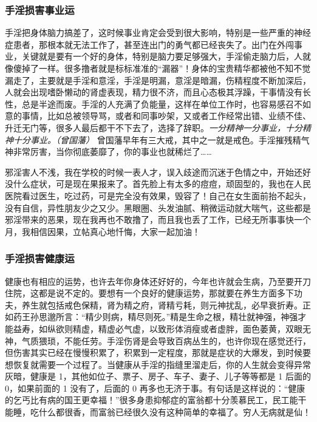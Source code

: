 \subsubsection{手淫损害事业运}

手淫把身体脑力搞差了，这时候事业肯定会受到很大影响，特别是一些严重的神经症患者，那根本就无法工作了，甚至连出门的勇气都已经丧失了。出门在外闯事业，关键就是要有一个好的身体，特别是脑力要足够强大，手淫偷走脑力后，人就像傻掉了一样。很多撸者就是标标准准的“漏器”！身体的宝贵精华都被他不知不觉漏走了，主要就是手淫和意淫，手淫是明漏，意淫是暗漏，伤精程度不断加深后，人就会出现嗜卧懒动的肾虚表现，精力很不济，而且心态极其浮躁，干事情没有长性，总是半途而废。手淫的人充满了负能量，这样在单位工作时，也容易感召不如意的事情，比如总被领导骂，或者和同事吵架，又或者工作经常出错、业绩不佳、升迁无门等，很多人最后都干不下去了，选择了辞职。\textit{一分精神一分事业，十分精神十分事业。（曾国藩）} 曾国藩早年有三大戒，其中之一就是戒色。手淫摧残精气神非常厉害，当你彻底萎靡了，你的事业也就稀烂了……

\begin{case}[手淫损害事业运]
    邪淫害人不浅，我在学校的时候一表人才，误入歧途而沉迷于色情之中，开始还好没什么症状，可是现在果报来了。首先脸上有太多的痘痘，顽固型的，我也在人民医院看过医生，吃过药，可是完全没有效果，毁容了！自己在女生面前抬不起头，没有自信，异性朋友少之又少。黑眼圈、头发油腻、稍微运动就大喘气，这些都是邪淫带来的恶果，现在我再也不敢撸了，而且我也丢了工作，已经无所事事快一个月，我相信因果，立帖真心地忏悔，大家一起加油！
\end{case}

\subsubsection{手淫损害健康运}

健康也有相应的运势，也许去年你身体还好好的，今年也许就会生病，乃至要开刀住院，这都是说不定的。要想有一个良好的健康运势，那就要在养生方面多下功夫，养生就包括戒色保精，肾为精之府，肾精亏耗，则元神扰乱，必早衰折寿。正如药王孙思邈所言：“精少则病，精尽则死。”精是生命之根，精壮就神强，神强才能益寿，如纵欲则精虚，精虚必气虚，以致形体消瘦或者虚胖，面色萎黄，双眼无神，气质猥琐，不能任劳。手淫伤肾是会导致百病丛生的，也许你现在感觉还行，但伤害其实已经在慢慢积累了，积累到一定程度，那就是症状的大爆发，到时候要想恢复就需要一个过程了。当健康从手淫的指缝里溜走后，你的人生就会变得异常灰暗，健康是 1，其他如位子、票子、房子、车子、妻子、儿子等等都是 1 后面的 0，如果前面的 1 没有了，后面的 0 再多也无济于事。有句话是这样说的：“健康的乞丐比有病的国王更幸福！”很多身患抑郁症的富翁都十分羡慕民工，民工能干能睡，吃什么都很香，而富翁已经很久没有这种简单的幸福了。穷人无病就是仙！

